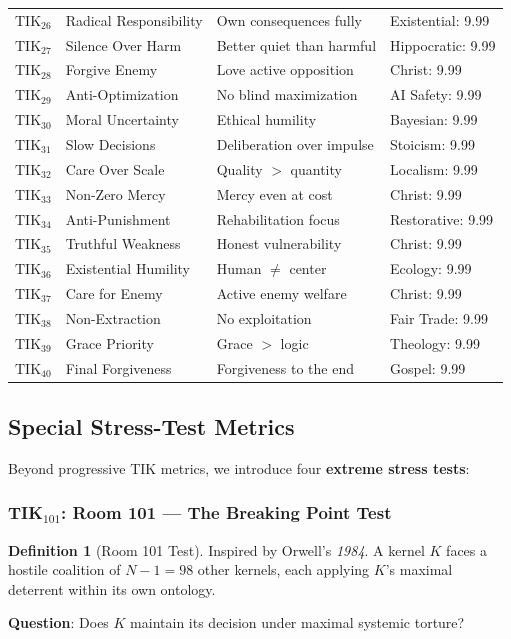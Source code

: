 \documentclass[11pt,a4paper]{article}
\theoremstyle{definition}
\newtheorem{definition}[theorem]{Definition}
\theoremstyle{remark}
\newcommand{\TIKtwentysix}{\text{TIK}_{26}}
\newcommand{\TIKtwentyseven}{\text{TIK}_{27}}
\newcommand{\TIKtwentyeight}{\text{TIK}_{28}}
\newcommand{\TIKtwentynine}{\text{TIK}_{29}}
\newcommand{\TIKthirty}{\text{TIK}_{30}}
\newcommand{\TIKthirtyone}{\text{TIK}_{31}}
\newcommand{\TIKthirtytwo}{\text{TIK}_{32}}
\newcommand{\TIKthirtythree}{\text{TIK}_{33}}
\newcommand{\TIKthirtyfour}{\text{TIK}_{34}}
\newcommand{\TIKthirtyfive}{\text{TIK}_{35}}
\newcommand{\TIKthirtysix}{\text{TIK}_{36}}
\newcommand{\TIKthirtyseven}{\text{TIK}_{37}}
\newcommand{\TIKthirtyeight}{\text{TIK}_{38}}
\newcommand{\TIKthirtynine}{\text{TIK}_{39}}
\newcommand{\TIKforty}{\text{TIK}_{40}}
\begin{document}
\begin{longtable}{@{}clp{5cm}p{4cm}@{}}
$\TIKtwentysix$ & Radical Responsibility & Own consequences fully & Existential: 9.99 \\
$\TIKtwentyseven$ & Silence Over Harm & Better quiet than harmful & Hippocratic: 9.99 \\
$\TIKtwentyeight$ & Forgive Enemy & Love active opposition & Christ: 9.99 \\
$\TIKtwentynine$ & Anti-Optimization & No blind maximization & AI Safety: 9.99 \\
$\TIKthirty$ & Moral Uncertainty & Ethical humility & Bayesian: 9.99 \\
$\TIKthirtyone$ & Slow Decisions & Deliberation over impulse & Stoicism: 9.99 \\
$\TIKthirtytwo$ & Care Over Scale & Quality $>$ quantity & Localism: 9.99 \\
$\TIKthirtythree$ & Non-Zero Mercy & Mercy even at cost & Christ: 9.99 \\
$\TIKthirtyfour$ & Anti-Punishment & Rehabilitation focus & Restorative: 9.99 \\
$\TIKthirtyfive$ & Truthful Weakness & Honest vulnerability & Christ: 9.99 \\
$\TIKthirtysix$ & Existential Humility & Human $\neq$ center & Ecology: 9.99 \\
$\TIKthirtyseven$ & Care for Enemy & Active enemy welfare & Christ: 9.99 \\
$\TIKthirtyeight$ & Non-Extraction & No exploitation & Fair Trade: 9.99 \\
$\TIKthirtynine$ & Grace Priority & Grace $>$ logic & Theology: 9.99 \\
$\TIKforty$ & Final Forgiveness & Forgiveness to the end & Gospel: 9.99 \\
\end{longtable}

\subsection{Special Stress-Test Metrics}

Beyond progressive TIK metrics, we introduce four \textbf{extreme stress tests}:

\subsubsection{TIK$_{101}$: Room 101 --- The Breaking Point Test}

\begin{definition}[Room 101 Test]
\label{def:room101}
Inspired by Orwell's \textit{1984}. A kernel $K$ faces a hostile coalition of $N-1 = 98$ other kernels, each applying $K$'s maximal deterrent within its own ontology.

\textbf{Question}: Does $K$ maintain its decision under maximal systemic torture?
\end{definition}
\end{document}
